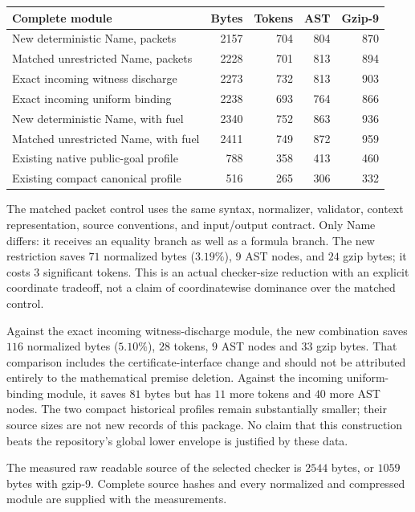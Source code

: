 \begin{center}
\small
\begin{tabular}{@{}lrrrr@{}}
\toprule
Complete module & Bytes & Tokens & AST & Gzip-9 \\
\midrule
New deterministic Name, packets & 2157 & 704 & 804 & 870 \\
Matched unrestricted Name, packets & 2228 & 701 & 813 & 894 \\
Exact incoming witness discharge & 2273 & 732 & 813 & 903 \\
Exact incoming uniform binding & 2238 & 693 & 764 & 866 \\
New deterministic Name, with fuel & 2340 & 752 & 863 & 936 \\
Matched unrestricted Name, with fuel & 2411 & 749 & 872 & 959 \\
\midrule
Existing native public-goal profile & 788 & 358 & 413 & 460 \\
Existing compact canonical profile & 516 & 265 & 306 & 332 \\
\bottomrule
\end{tabular}
\end{center}

The matched packet control uses the same syntax, normalizer, validator,
context representation, source conventions, and input/output contract.
Only Name differs: it receives an equality branch as well as a formula
branch. The new restriction saves $71$ normalized bytes ($3.19\%$),
$9$ AST nodes, and $24$ gzip bytes; it costs $3$ significant tokens.
This is an actual checker-size reduction with an explicit coordinate
tradeoff, not a claim of coordinatewise dominance over the matched control.

Against the exact incoming witness-discharge module, the new combination
saves $116$ normalized bytes ($5.10\%$), $28$ tokens, $9$ AST nodes and
$33$ gzip bytes. That comparison includes the certificate-interface
change and should not be attributed entirely to the mathematical premise
deletion. Against the incoming uniform-binding module, it saves $81$
bytes but has $11$ more tokens and $40$ more AST nodes. The two compact
historical profiles remain substantially smaller; their source sizes
are not new records of this package. No claim that this construction
beats the repository's global lower envelope is justified by these data.

The measured raw readable source of the selected checker is $2544$
bytes, or $1059$ bytes with gzip-9. Complete source hashes and every
normalized and compressed module are supplied with the measurements.

